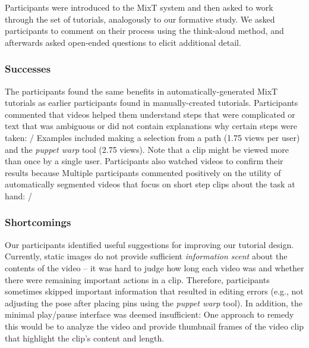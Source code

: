 Participants were introduced to the MixT system and then asked to work through the set of tutorials, analogously to our formative study. We asked participants to comment on their process using the think-aloud method, and afterwards asked open-ended questions to elicit additional detail.

\subsubsection{Successes}
The participants found the same benefits in automatically-generated MixT tutorials as earlier participants found in manually-created tutorials. Participants commented that videos helped them understand steps that were complicated or text that was ambiguous or did not contain explanations why certain steps were taken:  /  Examples included making a selection from a path (1.75 views per user) and the \emph{puppet warp} tool (2.75 views). Note that a clip might be viewed more than once by a single user. Participants also watched videos to confirm their results because 
%
Multiple participants commented positively on the utility of automatically segmented videos that focus on short step clips about the task at hand:  / 

\subsubsection{Shortcomings}
Our participants identified useful suggestions for improving our tutorial design. Currently, static images do not provide sufficient \emph{information scent} about the contents of the video – it was hard to judge how long each video was and whether there were remaining important actions in a clip. Therefore, participants sometimes skipped important information that resulted in editing errors (e.g., not adjusting the pose after placing pins using the \emph{puppet warp} tool). In addition, the minimal play/pause interface was deemed insufficient:  One approach to remedy this would be to analyze the video and provide thumbnail frames of the video clip that highlight the clip's content and length.

